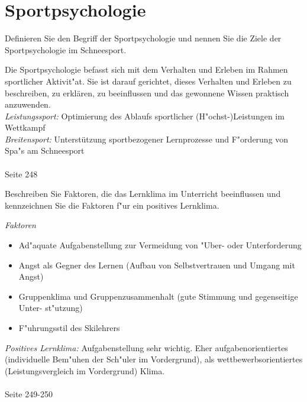 \section{Sportpsychologie}


\begin{question}{3}
Definieren Sie den Begriff der Sportpsychologie und nennen Sie die Ziele der Sportpsychologie im Schneesport.
\end{question}
\begin{solution}
Die Sportpsychologie befasst sich mit dem Verhalten und Erleben im Rahmen sportlicher Aktivit"at. Sie ist darauf gerichtet, dieses Verhalten und Erleben zu beschreiben, zu erklären, zu beeinflussen und das gewonnene Wissen praktisch anzuwenden.\\
\emph{Leistungssport:} Optimierung des Ablaufs sportlicher (H"ochst-)Leistungen im Wettkampf\\
\emph{Breitensport:} Unterstützung sportbezogener Lernprozesse und F"orderung von Spa"s am Schneesport\\\\
 Seite 248
\end{solution}

\begin{question}{4}
Beschreiben Sie Faktoren, die das Lernklima im Unterricht beeinflussen und kennzeichnen Sie die Faktoren f"ur ein positives Lernklima.
\end{question}
\begin{solution}
\emph{Faktoren}
\begin{itemize}
\item Ad"aquate Aufgabenstellung zur Vermeidung von "Uber- oder Unterforderung
\item Angst als Gegner des Lernen (Aufbau von Selbstvertrauen und Umgang mit Angst)
\item Gruppenklima und Gruppenzusammenhalt (gute Stimmung und gegenseitige Unter-
st"utzung)
\item F"uhrungsstil des Skilehrers
\end{itemize}
\emph{Positives Lernklima:} Aufgabenstellung sehr wichtig. Eher aufgabenorientiertes (individuelle Bem"uhen der Sch"uler im Vordergrund), als wettbewerbsorientiertes (Leistungsvergleich im Vordergrund) Klima.\\\\
 Seite 249-250
\end{solution}


